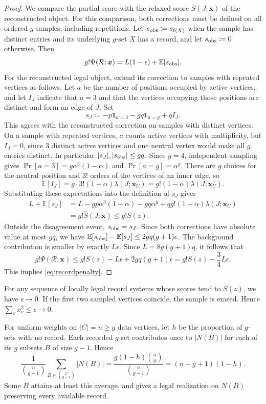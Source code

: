 \documentclass[10pt]{article}
\numberwithin{equation}{section}
\theoremstyle{definition}
\newcommand{\x}{\boldsymbol{x}}\newcommand{\y}{\boldsymbol{y}}
\begin{document}
\begin{proof}
We compare the partial score with the relaxed score $\overline S(J;\x)$ of the reconstructed object. For this comparison, both corrections must be defined on all ordered $g$-samples, including repetitions. Let $s_{\rm obs}\coloneqq s_{\ell(X)}$ when the sample has distinct entries and its underlying $g$-set $X$ has a record, and let $s_{\rm obs}\coloneqq0$ otherwise. Then
\[
 g!\Psi(\mathcal R;\x)=L(1-\epsilon)+\mathbb E[s_{\rm obs}].
\]
For the reconstructed legal object, extend its correction to samples with repeated vertices as follows. Let $a$ be the number of positions occupied by active vertices, and let $I_J$ indicate that $a=3$ and that the vertices occupying those positions are distinct and form an edge of $J$. Set
\[
 s_J\coloneqq-p\mathbf1_{a=3}-gq\mathbf1_{a=g}+qI_J.
\]
This agrees with the reconstructed correction on samples with distinct vertices. On a sample with repeated vertices, $a$ counts active vertices with multiplicity, but $I_J=0$, since $3$ distinct active vertices and one neutral vertex would make all $g$ entries distinct. In particular $|s_J|,|s_{\rm obs}|\le gq$. Since $g=4$, independent sampling gives $\Pr[a=3]=g\alpha^3(1-\alpha)$ and $\Pr[a=g]=\alpha^g$. There are $g$ choices for the neutral position and $3!$ orders of the vertices of an inner edge, so
\[
 \mathbb E[I_J]=g\cdot3!(1-\alpha)\lambda(J;\x_U)
              =g!(1-\alpha)\lambda(J;\x_U).
\]
Substituting these expectations into the definition of $s_J$ gives
\[
 \begin{aligned}
 L+\mathbb E[s_J]
 &=L-gp\alpha^3(1-\alpha)-gq\alpha^g
       +qg!(1-\alpha)\lambda(J;\x_U)\\
 &=g!\overline S(J;\x)\le g!S(z).
 \end{aligned}
\]
Outside the disagreement event, $s_{\rm obs}=s_J$. Since both corrections have absolute value at most $gq$, we have $\mathbb E[s_{\rm obs}]-\mathbb E[s_J]\le2gq(g+1)\epsilon$. The background contribution is smaller by exactly $L\epsilon$. Since $L=8g(g+1)q$, it follows that
\[
 g!\Psi(\mathcal R;\x)
 \le g!S(z)-L\epsilon+2gq(g+1)\epsilon
 =g!S(z)-\frac34L\epsilon.
\]
This implies \eqref{eq:recordpenalty}.
\end{proof}
For any sequence of locally legal record systems whose scores tend to $S(z)$, we have $\epsilon\to0$. If the first two sampled vertices coincide, the sample is erased. Hence $\sum_vx_v^2\le\epsilon\to0$.

For uniform weights on $|C|=n\ge g$ data vertices, let $h$ be the proportion of $g$-sets with no record. Each recorded $g$-set contributes once to $|N(B)|$ for each of its $g$ subsets $B$ of size $g-1$. Hence
\[
 \frac{1}{\binom n{g-1}}\sum_{B\in\binom C{g-1}}|N(B)|
 =\frac{g(1-h)\binom ng}{\binom n{g-1}}=(n-g+1)(1-h).
\]
Some $B$ attains at least this average, and  gives a legal realization on $N(B)$ preserving every available record.
\end{document}
